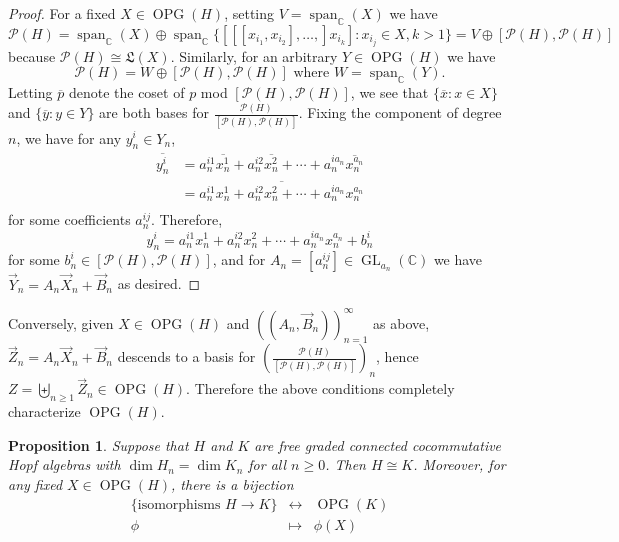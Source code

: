 \documentclass[11pt]{amsart}
\newtheorem{proposition}[theorem]{Proposition}
\theoremstyle{definition}
\numberwithin{equation}{section}
\DeclareMathOperator{\GL}{GL}
\DeclareMathOperator{\OPG}{OPG}
\begin{document}
\begin{proof}
    For a fixed $X \in \OPG(H)$, setting $V = \operatorname{span}_{\mathbb{C}}(X)$ we have 
    \[
    \mathcal{P}(H) = \operatorname{span}_{\mathbb{C}}(X) \oplus \operatorname{span}_{\mathbb{C}}\{[[[x_{i_1},x_{i_2}],\ldots,]x_{i_k}]:x_{i_j} \in X, k>1\} = V \oplus [\mathcal{P}(H),\mathcal{P}(H)]
    \]
    because $\mathcal{P}(H) \cong \mathfrak{L}(X)$. Similarly, for an arbitrary $Y \in \OPG(H)$ we have 
    \[
    \mathcal{P}(H) = W \oplus [\mathcal{P}(H),\mathcal{P}(H)] \text{  where  } W = \operatorname{span}_{\mathbb{C}}(Y).
    \]
    Letting $\overline{p}$ denote the coset of $p$ mod $[\mathcal{P}(H),\mathcal{P}(H)]$, we see that $\{\overline{x}:x \in X\}$ and $\{\overline{y}: y \in Y\}$ are both bases for $\displaystyle \frac{\mathcal{P}(H)}{[\mathcal{P}(H),\mathcal{P}(H)]}$. Fixing the component of degree $n$, we have for any $y_n^i \in Y_n$,
    \begin{align*}
        \overline{y_n^i} &= a_n^{i1}\overline{x_n^1} + a_n^{i2}\overline{x_n^2} + \cdots + a_n^{ia_n}\overline{x_n^{a_n}}\\ 
        &= \overline{a_n^{i1}x_n^1 + a_n^{i2}x_n^2 + \cdots + a_n^{ia_n}x_n^{a_n}}\\
    \end{align*}
    for some coefficients $a_n^{ij}$. Therefore,
    \[
    y_n^i = a_n^{i1}x_n^1 + a_n^{i2}x_n^2 + \cdots + a_n^{ia_n}x_n^{a_n} + b_n^i
    \]
    for some $b_n^i \in [\mathcal{P}(H),\mathcal{P}(H)]$, and for $A_n = [a_n^{ij}] \in \GL_{a_n}(\mathbb{C})$ we have $\vec{Y}_n = A_n \vec{X}_n + \vec{B}_n$ as desired. 
\end{proof}

Conversely, given $X \in \OPG(H)$ and $((A_n,\vec{B}_n))_{n=1}^\infty$ as above, $\vec{Z}_n = A_n\vec{X}_n + \vec{B}_n$ descends to a basis for $\displaystyle \left( \frac{\mathcal{P}(H)}{[\mathcal{P}(H),\mathcal{P}(H)]} \right)_n$, hence $Z = \biguplus_{n \geq 1}\vec{Z}_n \in \OPG(H)$. Therefore the above conditions completely characterize $\OPG(H)$.

\begin{proposition}
Suppose that $H$ and $K$ are free graded connected cocommutative Hopf algebras with $\dim H_n = \dim K_n$ for all $n \geq 0$.  Then $H \cong K$.  Moreover, for any fixed $X \in \OPG(H)$, there is a bijection
\[
\begin{array}{rcl}
\{\text{isomorphisms $H \to K$}\} &\leftrightarrow& \OPG(K) \\
\phi & \mapsto & \phi(X) \\
\end{array}
\]
\end{proposition}
\end{document}
